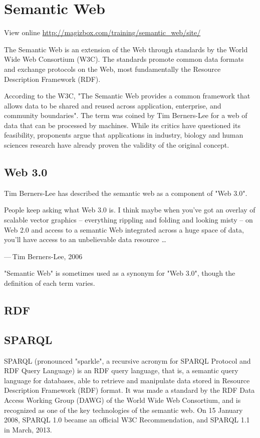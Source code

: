 \chapter{Semantic Web}

View online \href{http://magizbox.com/training/semantic_web/site/}{http://magizbox.com/training/semantic_web/site/}

The Semantic Web is an extension of the Web through standards by the World Wide Web Consortium (W3C). The standards promote common data formats and exchange protocols on the Web, most fundamentally the Resource Description Framework (RDF).

According to the W3C, "The Semantic Web provides a common framework that allows data to be shared and reused across application, enterprise, and community boundaries". The term was coined by Tim Berners-Lee for a web of data that can be processed by machines. While its critics have questioned its feasibility, proponents argue that applications in industry, biology and human sciences research have already proven the validity of the original concept.

\section{Web 3.0}

Tim Berners-Lee has described the semantic web as a component of "Web 3.0".

People keep asking what Web 3.0 is. I think maybe when you've got an overlay of scalable vector graphics – everything rippling and folding and looking misty – on Web 2.0 and access to a semantic Web integrated across a huge space of data, you'll have access to an unbelievable data resource …

— Tim Berners-Lee, 2006

"Semantic Web" is sometimes used as a synonym for "Web 3.0", though the definition of each term varies.

\section{RDF}

\section{SPARQL}

SPARQL (pronounced "sparkle", a recursive acronym for SPARQL Protocol and RDF Query Language) is an RDF query language, that is, a semantic query language for databases, able to retrieve and manipulate data stored in Resource Description Framework (RDF) format. It was made a standard by the RDF Data Access Working Group (DAWG) of the World Wide Web Consortium, and is recognized as one of the key technologies of the semantic web. On 15 January 2008, SPARQL 1.0 became an official W3C Recommendation, and SPARQL 1.1 in March, 2013.



